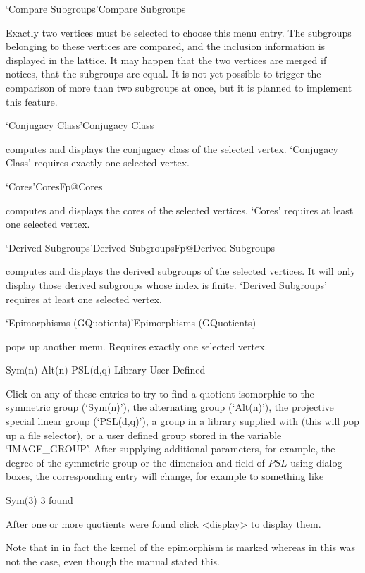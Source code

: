 \>`Compare Subgroups'{Compare Subgroups}

Exactly two vertices must be selected to choose this menu entry. The
subgroups belonging to these vertices are compared, and the inclusion
information is displayed in the lattice. It may happen that the two
vertices are merged if {\GAP} notices, that the subgroups are
equal. It is not yet possible to trigger the comparison of more than
two subgroups at once, but it is planned to implement this feature.

\>`Conjugacy Class'{Conjugacy Class}

computes and  displays  the   conjugacy  class of  the   selected vertex.
`Conjugacy Class' requires  exactly  one selected vertex.  

\>`Cores'{CoresFp}@{Cores}

computes and  displays the cores  of the selected vertices.   `Cores'
requires at least one selected vertex.

\>`Derived Subgroups'{Derived SubgroupsFp}@{Derived Subgroups}

computes and displays the derived subgroups of the selected vertices.  It
will  only  display  those derived    subgroups  whose index is   finite.
`Derived Subgroups' requires at least one selected vertex.

\>`Epimorphisms (GQuotients)'{Epimorphisms (GQuotients)}

pops up another menu. Requires exactly one selected vertex.

\begintt
Sym(n)
Alt(n)
PSL(d,q)
Library
User Defined 
\endtt

Click on any of these entries to try to find a quotient isomorphic to the
symmetric group (`Sym(n)'), the alternating group (`Alt(n)'), the projective
special linear group (`PSL(d,q)'), a group in a library supplied with
{\XGAP} (this will pop up a file selector), or a user defined group stored
in the variable `IMAGE_GROUP'.  After supplying additional parameters, for
example, the degree of the symmetric group or the dimension and field of
$PSL$ using dialog boxes, the corresponding entry will change, for example
to something like

\begintt
Sym(3)        3 found
\endtt

After one or more quotients were found click <display> to display them.

Note that in {} in fact the kernel of the epimorphism is marked whereas 
in {} this was not the case, even though the {} manual stated
this.  

